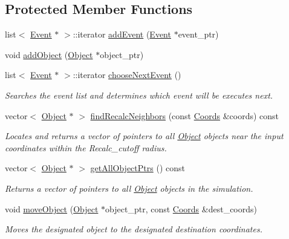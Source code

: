 \subsection*{Protected Member Functions}
\begin{DoxyCompactItemize}
\item 
list$<$ \hyperlink{class_event}{Event} $\ast$ $>$\+::iterator \hyperlink{class_simulation_a4b84249d359723e00ec4ae77164c8b7d}{add\+Event} (\hyperlink{class_event}{Event} $\ast$event\+\_\+ptr)
\item 
void \hyperlink{class_simulation_a1e0f43c4e11eda5486054c250f4de08f}{add\+Object} (\hyperlink{class_object}{Object} $\ast$object\+\_\+ptr)
\item 
list$<$ \hyperlink{class_event}{Event} $\ast$ $>$\+::iterator \hyperlink{class_simulation_a401d40509ba367a28702873a0d65188d}{choose\+Next\+Event} ()
\begin{DoxyCompactList}\small\item\em Searches the event list and determines which event will be executes next. \end{DoxyCompactList}\item 
vector$<$ \hyperlink{class_object}{Object} $\ast$ $>$ \hyperlink{class_simulation_aa6501dc60b4a3981f6ca44cec861364a}{find\+Recalc\+Neighbors} (const \hyperlink{struct_coords}{Coords} \&coords) const
\begin{DoxyCompactList}\small\item\em Locates and returns a vector of pointers to all \hyperlink{class_object}{Object} objects near the input coordinates within the Recalc\+\_\+cutoff radius. \end{DoxyCompactList}\item 
\mbox{\label{class_simulation_a620684b9ac1fb07344c4c2237ed9f352}} 
vector$<$ \hyperlink{class_object}{Object} $\ast$ $>$ \hyperlink{class_simulation_a620684b9ac1fb07344c4c2237ed9f352}{get\+All\+Object\+Ptrs} () const
\begin{DoxyCompactList}\small\item\em Returns a vector of pointers to all \hyperlink{class_object}{Object} objects in the simulation. \end{DoxyCompactList}\item 
void \hyperlink{class_simulation_a7b10f51640088366d0d1278361817e8d}{move\+Object} (\hyperlink{class_object}{Object} $\ast$object\+\_\+ptr, const \hyperlink{struct_coords}{Coords} \&dest\+\_\+coords)
\begin{DoxyCompactList}\small\item\em Moves the designated object to the designated destination coordinates. \end{DoxyCompactList}\item 

\end{DoxyCompactItemize}
